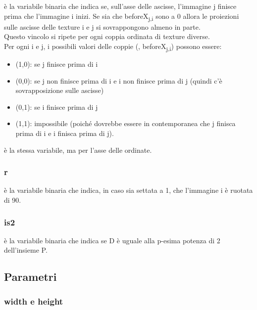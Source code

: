 
\beforeXij{} è la variabile binaria che indica se, sull'asse delle ascisse, l'immagine j finisce prima che l'immagine i inizi. Se sia \beforeXij{} che beforeX\textsubscript{j,i} sono a 0 allora le proiezioni sulle ascisse delle texture i e j si sovrappongono almeno in parte. \\
Questo vincolo si ripete per ogni coppia ordinata di texture diverse. \\
Per ogni i e j, i possibili valori delle coppie (\beforeXij, beforeX\textsubscript{j,i}) possono essere:
\begin{itemize}
	\itemsep0em
	\item (1,0): se j finisce prima di i
	\item (0,0): se j non finisce prima di i e i non finisce prima di j (quindi c'è sovrapposizione sulle ascisse)
	\item (0,1): se i finisce prima di j
	\item (1,1): impossibile (poiché dovrebbe essere in contemporanea che j finisca prima di i e i finisca prima di j).
\end{itemize}
\beforeYij{} è la stessa variabile, ma per l'asse delle ordinate.


\subsubsection{r}

{\ri} è la variabile binaria che indica, in caso sia settata a 1, che l'immagine i è ruotata di 90\degree.

\subsubsection{is2}
\isTp{} è la variabile binaria che indica se D è uguale alla p-esima potenza di 2 dell'insieme P.








\subsection{Parametri}

\subsubsection{width e height}


